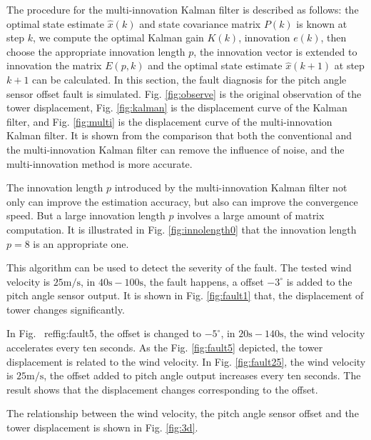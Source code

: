 The procedure for the multi-innovation Kalman filter is described as follows:
the optimal state estimate $\hat{x}(k)$ and state covariance matrix $P(k)$  is known
at step $k$, we compute the optimal Kalman gain $K(k)$, innovation $e(k)$,
then choose the appropriate innovation length $p$, the innovation vector is extended
to innovation the matrix $E(p, k)$ and the optimal state estimate $\hat{x}(k+1)$
at step $k+1$ can be calculated.
In this section, the fault diagnosis for the pitch angle sensor offset fault is
simulated. Fig. \ref{fig:observe} is the original observation of the tower displacement,
Fig. \ref{fig:kalman} is the displacement curve of the Kalman filter, and
Fig. \ref{fig:multi}
is the displacement curve of the multi-innovation Kalman filter. It is shown
from the comparison that both the conventional and the multi-innovation Kalman filter
can remove the influence of noise, and the multi-innovation method is more accurate.

The innovation length $p$ introduced by the multi-innovation Kalman filter not
only can improve the estimation accuracy, but also can improve the
convergence speed. But a large innovation length $p$ involves a large amount of
matrix computation. It is illustrated in
Fig. \ref{fig:innolength0} that the innovation length $p=8$ is
an appropriate one.

This algorithm can be used to detect the severity of the fault. The tested
wind velocity is $25\mathrm{m/s}$, in $40\mathrm{s}-100\mathrm{s}$, the fault happens, a offset $-3^\circ$
is added to the pitch angle sensor output. It is shown in
Fig. \ref{fig:fault1} that,  the displacement of tower changes significantly.

In
Fig. \ ref{fig:fault5},
the offset is changed to $-5^\circ$, in $20\mathrm{s}-140\mathrm{s}$,  the wind velocity accelerates
every ten seconds. As the Fig. \ref{fig:fault5} depicted, the tower displacement is related
to the wind velocity.
In Fig. \ref{fig:fault25}, the wind velocity is $25\mathrm{m/s}$, the offset added to
pitch angle output increases every ten seconds. The result shows that the displacement
changes corresponding to the offset.

The relationship between the wind velocity, the pitch angle sensor offset and the tower
displacement is shown in Fig. \ref{fig:3d}.



